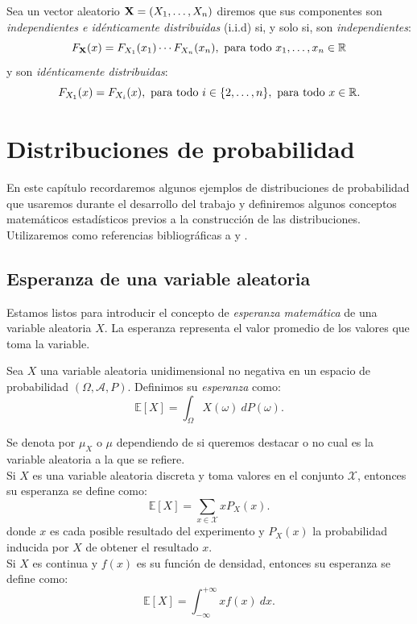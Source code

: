 \documentclass[oneside,openright,titlepage,numbers=noenddot,openany,headinclude,footinclude=true,
cleardoublepage=empty,abstractoff,BCOR=5mm,paper=a4,fontsize=12pt,main=spanish]{scrreprt}
\begin{document}
\begin{definition}
Sea un vector aleatorio $\textbf{X}=(X_1,\dots,X_n)$ diremos que sus componentes son \textit{independientes e idénticamente distribuidas} (i.i.d) si, y solo si, son \textit{independientes}: $$F_{\nm{X}}(x)=F_{X_1}(x_1)\cdots F_{X_n}(x_n), \ \text{para todo} \ x_1,\dots,x_n \in \R$$
y son \textit{idénticamente distribuidas}: $$F_{X_1}(x)=F_{X_i}(x), \ \text{para todo} \ i \in \{2,\dots,n\}, \ \text{para todo} \ x \in \R.$$
\end{definition}


\chapter{Distribuciones de probabilidad}

En este capítulo recordaremos algunos ejemplos de distribuciones de probabilidad que usaremos durante el desarrollo del trabajo y definiremos algunos conceptos matemáticos estadísticos previos a la construcción de las distribuciones. Utilizaremos como referencias bibliográficas a \cite{random2004} y \cite{probability2014}.

\section{Esperanza de una variable aleatoria}

Estamos listos para introducir el concepto de \textit{esperanza matemática} de una variable aleatoria $X$. La esperanza representa el valor promedio de los valores que toma la variable.\\


\begin{definition}
Sea $X$ una variable aleatoria unidimensional no negativa en un espacio de probabilidad $(\Omega, \mathcal{A},P)$. Definimos su \textit{esperanza} como: $$\mathbb{E}[X]=\int_{\Omega} X(\omega) \ dP(\omega).$$

Se denota por $\mu_X$ o $\mu$ dependiendo de si queremos destacar o no cual es la variable aleatoria a la que se refiere.\\

Si $X$ es una variable aleatoria discreta y toma valores en el conjunto $\mathcal{X}$, entonces su esperanza se define como: $$\mathbb{E}[X]=\sum_{x\in \mathcal{X}} x P_X(x).$$ donde $x$ es cada posible resultado del experimento y $P_X(x)$ la probabilidad inducida por $X$ de obtener el resultado $x$.\\

Si $X$ es continua y $f(x)$ es su función de densidad, entonces su esperanza se define como: $$\mathbb{E}[X]=\int_{-\infty}^{+\infty}x f(x) \ dx.$$
\end{definition}\
\end{document}
